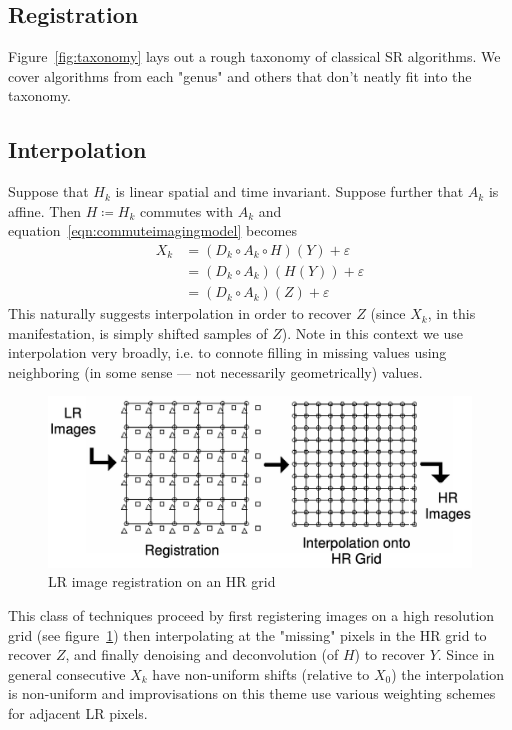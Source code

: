 \subsection{Registration}

Figure~\ref{fig:taxonomy} lays out a rough taxonomy of classical SR algorithms.
%
We cover algorithms from each "genus" and others that don't neatly fit into the taxonomy.
\subsection{Interpolation}
Suppose that $H_k$ is linear spatial and time invariant.
%
Suppose further that $A_k$ is affine.
%
Then $H \coloneqq H_k$ commutes with $A_k$\cite{meladcommute} and equation~\ref{eqn:commuteimagingmodel} becomes
\begin{align}
    X_k &= (D_k \circ A_k \circ H) (Y) + \varepsilon \\
    &= (D_k \circ A_k) (H(Y)) + \varepsilon \\
    &= (D_k \circ A_k) (Z) + \varepsilon
    \label{eqn:commuteimagingmodel}
\end{align}
This naturally suggests interpolation in order to recover $Z$ (since $X_k$, in this manifestation, is simply shifted samples of $Z$).
%
Note in this context we use interpolation very broadly, i.e. to connote filling in missing values using neighboring (in some sense --- not necessarily geometrically) values.
%
\begin{figure}
    \centering
    \includegraphics[width=\linewidth]{figures/hrgrid.png}
    \caption{LR image registration on an HR grid\cite{Lin}}
    \label{fig:hrgrid}
\end{figure}
This class of techniques proceed by first registering images on a high resolution grid (see figure~\ref{fig:hrgrid}) then interpolating at the "missing" pixels in the HR grid to recover $Z$, and finally denoising and deconvolution (of $H$) to recover $Y$.
%
Since in general consecutive $X_k$ have non-uniform shifts (relative to $X_0$) the interpolation is non-uniform and improvisations on this theme use various weighting schemes for adjacent LR pixels.

